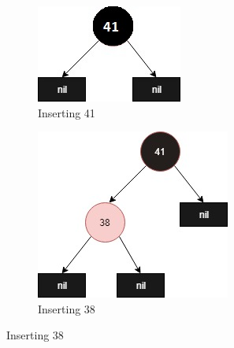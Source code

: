 \documentclass[20pt]{article} %
\begin{document}
\begin{figure}[!htbp]
  	\centering
   	\begin{subfigure}[p]{0.4\linewidth}
    	\includegraphics[width=\linewidth]{1.jpg}
     	\caption{Inserting 41}
   	\end{subfigure}
  	\begin{subfigure}[p]{0.4\linewidth}
    	\includegraphics[width=\linewidth]{2.jpg}
    	\caption{Inserting 38}
  	\end{subfigure}


\end{figure}
\end{document}
